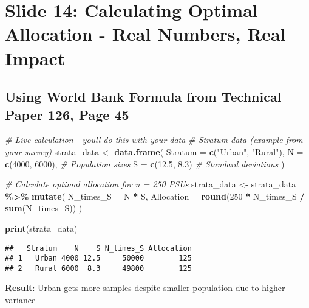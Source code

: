\documentclass[
]{article}
\newenvironment{Shaded}{\begin{snugshade}}{\end{snugshade}}
\newcommand{\AttributeTok}[1]{\textcolor[rgb]{0.13,0.29,0.53}{#1}}
\newcommand{\CommentTok}[1]{\textcolor[rgb]{0.56,0.35,0.01}{\textit{#1}}}
\newcommand{\DecValTok}[1]{\textcolor[rgb]{0.00,0.00,0.81}{#1}}
\newcommand{\FloatTok}[1]{\textcolor[rgb]{0.00,0.00,0.81}{#1}}
\newcommand{\FunctionTok}[1]{\textcolor[rgb]{0.13,0.29,0.53}{\textbf{#1}}}
\newcommand{\NormalTok}[1]{#1}
\newcommand{\OtherTok}[1]{\textcolor[rgb]{0.56,0.35,0.01}{#1}}
\newcommand{\SpecialCharTok}[1]{\textcolor[rgb]{0.81,0.36,0.00}{\textbf{#1}}}
\newcommand{\StringTok}[1]{\textcolor[rgb]{0.31,0.60,0.02}{#1}}
\begin{document}
\section{Slide 14: Calculating Optimal Allocation - Real Numbers, Real
Impact}\label{slide-14-calculating-optimal-allocation---real-numbers-real-impact}

\subsection{Using World Bank Formula from Technical Paper 126, Page
45}\label{using-world-bank-formula-from-technical-paper-126-page-45}

\begin{Shaded}
\begin{Highlighting}[]
\CommentTok{\# Live calculation {-} you\textquotesingle{}ll do this with your data}
\CommentTok{\# Stratum data (example from your survey)}
\NormalTok{strata\_data }\OtherTok{\textless{}{-}} \FunctionTok{data.frame}\NormalTok{(}
  \AttributeTok{Stratum =} \FunctionTok{c}\NormalTok{(}\StringTok{"Urban"}\NormalTok{, }\StringTok{"Rural"}\NormalTok{),}
  \AttributeTok{N =} \FunctionTok{c}\NormalTok{(}\DecValTok{4000}\NormalTok{, }\DecValTok{6000}\NormalTok{),  }\CommentTok{\# Population sizes}
  \AttributeTok{S =} \FunctionTok{c}\NormalTok{(}\FloatTok{12.5}\NormalTok{, }\FloatTok{8.3}\NormalTok{)    }\CommentTok{\# Standard deviations}
\NormalTok{)}

\CommentTok{\# Calculate optimal allocation for n = 250 PSUs}
\NormalTok{strata\_data }\OtherTok{\textless{}{-}}\NormalTok{ strata\_data }\SpecialCharTok{\%\textgreater{}\%}
  \FunctionTok{mutate}\NormalTok{(}
    \AttributeTok{N\_times\_S =}\NormalTok{ N }\SpecialCharTok{*}\NormalTok{ S,}
    \AttributeTok{Allocation =} \FunctionTok{round}\NormalTok{(}\DecValTok{250} \SpecialCharTok{*}\NormalTok{ N\_times\_S }\SpecialCharTok{/} \FunctionTok{sum}\NormalTok{(N\_times\_S))}
\NormalTok{  )}

\FunctionTok{print}\NormalTok{(strata\_data)}
\end{Highlighting}
\end{Shaded}

\begin{verbatim}
##   Stratum    N    S N_times_S Allocation
## 1   Urban 4000 12.5     50000        125
## 2   Rural 6000  8.3     49800        125
\end{verbatim}

\textbf{Result}: Urban gets more samples despite smaller population due
to higher variance
\end{document}
